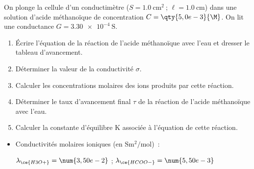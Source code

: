 On plonge la cellule d'un conductimètre ($S=\qty{1,0}{\square\cm}~$;
$\ell=\qty{1,0}{\cm}$) dans une solution d'acide méthanoïque  de
concentration $C=\qty{5,0e-3}{\M}$. On lit une conductance
$G=\qty{3,30e-4}{\siemens}$.

\begin{enumerate}
    \item Écrire l'équation de la réaction de l'acide méthanoïque avec l'eau et
          dresser le tableau d'avancement.
    \item Déterminer la valeur de la conductivité $\sigma$.
    \item Calculer les concentrations molaires des ions produits par cette
          réaction.
    \item Déterminer le taux d'avancement final $\tau$ de la réaction de l'acide
          méthanoïque avec l'eau.
    \item Calculer la constante d'équilibre $\mathrm{K}$ associée à l'équation
          de cette réaction.
\end{enumerate}

\begin{donnees}
    \begin{itemize}
        \item Conductivités molaires ioniques (en
              $\unit{\siemens\square\meter\per\mole}$)~: \par
              $\lambda_{\ce{H3O+}}=\num{3,50e-2}$ \;; \;
              $\lambda_{\ce{HCOO-}}=\num{5,50e-3}$
    \end{itemize}
\end{donnees}

